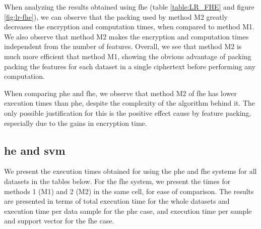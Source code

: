 When analyzing the results obtained using \ac{fhe} (table \ref{table:LR_FHE} and figure \ref{fig:lr-fhe}), we can observe that the packing used by method M2 greatly decreases the encryption and computation times, when compared to method M1. We also observe that method M2 makes the encryption and computation times independent from the number of features.
Overall, we see that method M2 is much more efficient that method M1, showing the obvious advantage of packing packing the features for each dataset in a single ciphertext before performing any computation.

When comparing \ac{phe} and \ac{fhe}, we observe that method M2 of \ac{fhe} has lower execution times than \ac{phe}, despite the complexity of the algorithm behind it. The only possible justification for this is the positive effect cause by feature packing, especially due to the gains in encryption time.




\subsection{\acl{he} and \acl{svm}}


We present the execution times obtained for using the \ac{phe} and \ac{fhe} systems for all datasets in the tables below. For the \ac{fhe} system, we present the times for methods 1 (M1) and 2 (M2) in the same cell, for ease of comparison. The results are presented in terms of total execution time for the whole datasets and execution time per data sample for the \ac{phe} case, and execution time per sample and support vector for the \ac{fhe} case.


